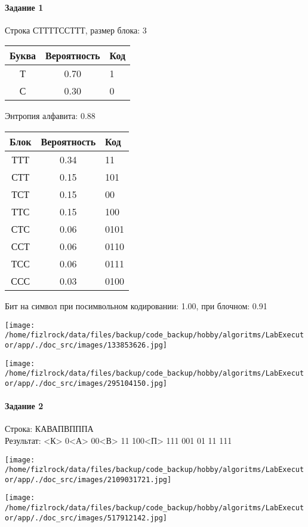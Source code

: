 \documentclass[a4paper, 12pt]{article}
\begin{document}
\paragraph{Задание 1}

Строка СТТТТССТТТ, размер блока: 3
\begin{center}
 \begin{tabular}{ |c|c|l| } 
  \hline
     Буква & Вероятность & Код\\ \hline
Т & 0.70 & 1\\\hline
С & 0.30 & 0
\\ \hline \end{tabular}
\end{center}
Энтропия алфавита: 0.88
\begin{center}
 \begin{tabular}{ |c|c|l| } 
  \hline
     Блок & Вероятность & Код\\ \hline
ТТТ & 0.34 & 11\\\hline
СТТ & 0.15 & 101\\\hline
ТСТ & 0.15 & 00\\\hline
ТТС & 0.15 & 100\\\hline
СТС & 0.06 & 0101\\\hline
ССТ & 0.06 & 0110\\\hline
ТСС & 0.06 & 0111\\\hline
ССС & 0.03 & 0100
\\ \hline \end{tabular}
\end{center}
Бит на символ при посимвольном кодировании: 1.00, при блочном: 0.91

\texttt{[image: /home/fizlrock/data/files/backup/code\_backup/hobby/algoritms/LabExecutor/app/./doc\_src/images/133853626.jpg]}

\texttt{[image: /home/fizlrock/data/files/backup/code\_backup/hobby/algoritms/LabExecutor/app/./doc\_src/images/295104150.jpg]}
\pagebreak
\paragraph{Задание 2}

Строка: 
КАВАПВПППА\\
Результат: <К> 0<А> 00<В> 11 100<П> 111 001 01 11 111

\texttt{[image: /home/fizlrock/data/files/backup/code\_backup/hobby/algoritms/LabExecutor/app/./doc\_src/images/2109031721.jpg]}

\texttt{[image: /home/fizlrock/data/files/backup/code\_backup/hobby/algoritms/LabExecutor/app/./doc\_src/images/517912142.jpg]}
\end{document}
